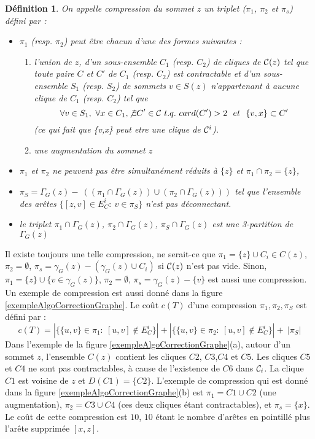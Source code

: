 \documentclass[onecolumn, 12pt]{book}
\newtheorem{definition}{D\'efinition}
\begin{document}
\begin{definition}
On appelle {\em compression} du sommet $z$ un triplet ($\pi_1$, $\pi_2$ et $\pi_s$) d\'efini par : 
\begin{itemize}
	\item $\pi_1$ (resp. $\pi_2$) peut \^etre  chacun d'une des formes suivantes :
	\begin{enumerate}
		\item l'union de $z$, d'un sous-ensemble $C_1$ (resp. $C_2$) de cliques de ${\cal C}(z)$ tel que toute paire $C$ et $C'$ de $C_1$ (resp. $C_2$) est contractable et d'un sous-ensemble $S_1$ (resp. $S_2$) de sommets $v \in S(z)$ n'appartenant \`a aucune clique de $C_1$ (resp. $C_2$) tel que
		$$ \forall v \in S_1,~\forall x \in C_1, \not\exists C' \in {\cal C}~t.q.~card(C')>2~~et~~\{v,x\} \subset C'$$
		(ce qui fait que \{v,x\} peut etre une clique de ${\cal C}^i$).
		\item une augmentation du sommet $z$
	\end{enumerate}
	\item $\pi_1$ et $\pi_2$ ne peuvent pas \^etre simultan\'ement r\'eduits \`a $\{z\}$ et $\pi_1 \cap \pi_2 = \{z\}$,
	\item $\pi_S=\Gamma_G(z)-~((\pi_1 \cap \Gamma_G(z)) \cup(\pi_2 \cap \Gamma_G(z)))$ tel que l'ensemble des ar\^etes  $\{[z,v]\in E_{C}^{i}:~v\in \pi_S\}$ n'est pas d\'econnectant.
	\item le triplet $\pi_{1} \cap \Gamma_{G}(z)$, $\pi_{2} \cap \Gamma_{G}(z)$, $\pi_{S} \cap \Gamma_{G}(z)$  est une 3-partition de $\Gamma_G(z)$
\end{itemize}
\end{definition}
Il existe toujours une telle compression, ne serait-ce que 
$\pi_1 = \{z\} \cup C_i \in C(z)$, 
$\pi_2 =  \emptyset$,
$\pi_s = \gamma_G(z) -(\gamma_G(z) \cup C_i) $  si ${\cal C}(z)$ n'est pas vide.
Sinon, 
$\pi_1 = \{z\} \cup \{ v \in \gamma_G(z)  \} $, 
$\pi_2 =  \emptyset$,
$\pi_s = \gamma_G(z) - \{v\} $
est aussi une compression.
Un exemple de compression est aussi donn\'e dans la figure \ref{exempleAlgoCorrectionGraphe}.
Le co\^ut $c(T)$ d'une compression $\pi_{1},\pi_{2},\pi_{S}$ est d\'efini par : 
$$c(T) = | \{\{u,v\} \in \pi_{1}:~[u,v]\not\in E_{C}^{i}\}| + |\{\{u,v\} \in \pi_2:~[u,v]\not\in E_{C}^{i}\}| +~ |\pi_S| $$
Dans l'exemple de la figure \ref{exempleAlgoCorrectionGraphe}(a), autour d'un sommet $z$, l'ensemble $C(z)$ contient les cliques $C2$, $C3$,$C4$ et $C5$.
Les cliques $C5$ et $C4$ ne sont pas contractables, \`a cause de l'existence de $C6$ dans ${\cal C}_i$.
La clique $C1$ est voisine de $z$ et $D(C1) = \{C2\}$.
L'exemple de compression qui est donn\'e dans la figure \ref{exempleAlgoCorrectionGraphe}(b) est $\pi_1 = C1 \cup C2$ (une augmentation), $\pi_2 = C3 \cup C4$ (ces deux cliques \'etant contractables), et $\pi_s = \{x\}$.
Le co\^ut  de cette compression est $10$, $10$ \'etant le nombre d'ar\^etes en pointill\'e plus l'ar\^ete supprim\'ee $[x,z]$.
\newline
\end{document}
